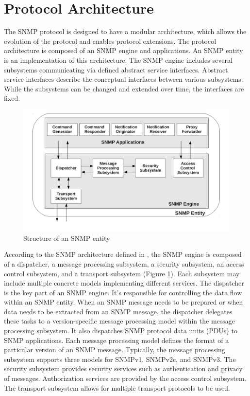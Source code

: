 \section{Protocol Architecture}
The SNMP protocol is designed to have a modular architecture, which allows the evolution of the protocol and enables protocol extensions. The protocol architecture is composed of an SNMP engine and applications. An SNMP entity is an implementation of this architecture. The SNMP engine includes several subsystems communicating via defined abstract service interfaces. Abstract service interfaces describe the conceptual interfaces between various subsystems.  While the subsystems can be changed and extended over time, the interfaces are fixed.

\begin{figure}[htp]	
\begin{center}
    \includegraphics[scale = 0.6]{img/snmp-arch.pdf}
    \caption{Structure of an SNMP entity}   
	\label{fig:snmparch}
\end{center}
\end{figure}

According to the SNMP architecture defined in \cite{rfc3411}, the SNMP engine is composed of a dispatcher, a message processing subsystem, a security subsystem, an access control subsystem, and a transport subsystem (Figure \ref{fig:snmparch}). Each subsystem may include multiple concrete models implementing different services. The dispatcher is the key part of an SNMP engine. It's responsible for controlling the data flow within an SNMP entity. When an SNMP message needs to be prepared or when data needs to be extracted from an SNMP message, the dispatcher delegates these tasks to a version-specific message processing model within the message processing subsystem. It also dispatches SNMP  protocol data units (PDUs) to SNMP applications. Each message processing model defines the format of a particular version of an SNMP message. Typically, the message processing subsystem supports three models for SNMPv1, SNMPv2c, and SNMPv3. The security subsystem provides security services such as authentication and privacy of messages. Authorization services are provided by the access control subsystem. The transport subsystem \cite{rfc5590} allows for multiple transport protocols to be used.


